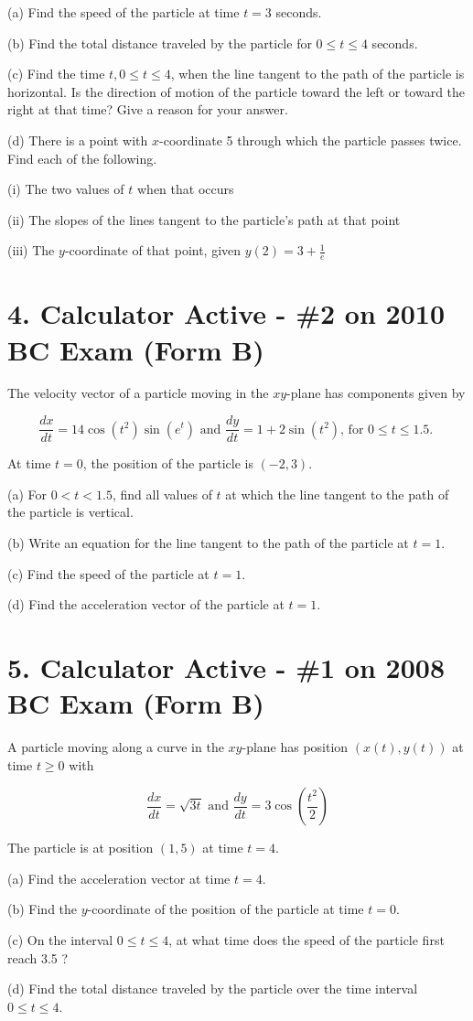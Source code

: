 \documentclass[10pt]{article}
\begin{document}
(a) Find the speed of the particle at time $t=3$ seconds.

(b) Find the total distance traveled by the particle for $0 \leq t \leq 4$ seconds.

(c) Find the time $t, 0 \leq t \leq 4$, when the line tangent to the path of the particle is horizontal. Is the direction of motion of the particle toward the left or toward the right at that time? Give a reason for your answer.

(d) There is a point with $x$-coordinate 5 through which the particle passes twice. Find each of the following.

(i) The two values of $t$ when that occurs

(ii) The slopes of the lines tangent to the particle's path at that point

(iii) The $y$-coordinate of that point, given $y(2)=3+\frac{1}{e}$

\section*{4. Calculator Active - \#2 on 2010 BC Exam (Form B)}
The velocity vector of a particle moving in the $x y$-plane has components given by

$$
\frac{d x}{d t}=14 \cos \left(t^{2}\right) \sin \left(e^{t}\right) \text { and } \frac{d y}{d t}=1+2 \sin \left(t^{2}\right) \text {, for } 0 \leq t \leq 1.5 \text {. }
$$

At time $t=0$, the position of the particle is $(-2,3)$.

(a) For $0<t<1.5$, find all values of $t$ at which the line tangent to the path of the particle is vertical.

(b) Write an equation for the line tangent to the path of the particle at $t=1$.

(c) Find the speed of the particle at $t=1$.

(d) Find the acceleration vector of the particle at $t=1$.

\section*{5. Calculator Active - \#1 on 2008 BC Exam (Form B)}
A particle moving along a curve in the $x y$-plane has position $(x(t), y(t))$ at time $t \geq 0$ with

$$
\frac{d x}{d t}=\sqrt{3 t} \text { and } \frac{d y}{d t}=3 \cos \left(\frac{t^{2}}{2}\right)
$$

The particle is at position $(1,5)$ at time $t=4$.

(a) Find the acceleration vector at time $t=4$.

(b) Find the $y$-coordinate of the position of the particle at time $t=0$.

(c) On the interval $0 \leq t \leq 4$, at what time does the speed of the particle first reach 3.5 ?

(d) Find the total distance traveled by the particle over the time interval $0 \leq t \leq 4$.
\end{document}
